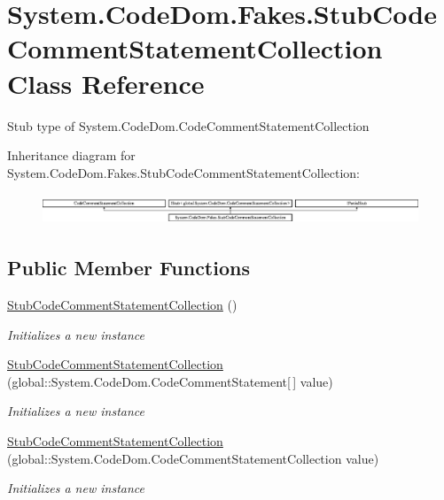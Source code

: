 \hypertarget{class_system_1_1_code_dom_1_1_fakes_1_1_stub_code_comment_statement_collection}{\section{System.\-Code\-Dom.\-Fakes.\-Stub\-Code\-Comment\-Statement\-Collection Class Reference}
\label{class_system_1_1_code_dom_1_1_fakes_1_1_stub_code_comment_statement_collection}
}


Stub type of System.\-Code\-Dom.\-Code\-Comment\-Statement\-Collection 


Inheritance diagram for System.\-Code\-Dom.\-Fakes.\-Stub\-Code\-Comment\-Statement\-Collection\-:\begin{figure}[H]
\begin{center}
\leavevmode
\includegraphics[height=0.924092cm]{class_system_1_1_code_dom_1_1_fakes_1_1_stub_code_comment_statement_collection}
\end{center}
\end{figure}
\subsection*{Public Member Functions}
\begin{DoxyCompactItemize}
\item 
\hyperlink{class_system_1_1_code_dom_1_1_fakes_1_1_stub_code_comment_statement_collection_a22cc0142c3556c70acdc648d48793168}{Stub\-Code\-Comment\-Statement\-Collection} ()
\begin{DoxyCompactList}\small\item\em Initializes a new instance\end{DoxyCompactList}\item 
\hyperlink{class_system_1_1_code_dom_1_1_fakes_1_1_stub_code_comment_statement_collection_a3740f4f4a2260736f33dc4fcf15418d7}{Stub\-Code\-Comment\-Statement\-Collection} (global\-::\-System.\-Code\-Dom.\-Code\-Comment\-Statement\mbox{[}$\,$\mbox{]} value)
\begin{DoxyCompactList}\small\item\em Initializes a new instance\end{DoxyCompactList}\item 
\hyperlink{class_system_1_1_code_dom_1_1_fakes_1_1_stub_code_comment_statement_collection_ae72b8c61fde01b6e8e85b63bba418b67}{Stub\-Code\-Comment\-Statement\-Collection} (global\-::\-System.\-Code\-Dom.\-Code\-Comment\-Statement\-Collection value)
\begin{DoxyCompactList}\small\item\em Initializes a new instance\end{DoxyCompactList}\end{DoxyCompactItemize}
